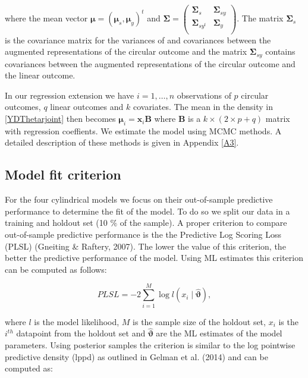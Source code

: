 \documentclass[11pt,]{article}
\begin{document}
where the mean vector
\(\boldsymbol{\mu} = (\boldsymbol{\mu}_s, \boldsymbol{\mu}_y)^t\) and
\(\boldsymbol{\Sigma} = \left ( \begin{matrix} \boldsymbol{\Sigma}_s & \boldsymbol{\Sigma}_{sy} \\ \boldsymbol{\Sigma}_{sy^t} & \boldsymbol{\Sigma}_y \\ \end{matrix} \right )\).
The matrix \(\boldsymbol{\Sigma}_s\) is the covariance matrix for the
variances of and covariances between the augmented representations of
the circular outcome and the matrix \(\boldsymbol{\Sigma}_{sy}\)
contains covariances between the augmented representations of the
circular outcome and the linear outcome.

In our regression extension we have \(i = 1, \dots, n\) observations of
\(p\) circular outcomes, \(q\) linear outcomes and \(k\) covariates. The
mean in the density in \eqref{YDThetarjoint} then becomes
\(\boldsymbol{\mu}_i = \boldsymbol{x}_i\boldsymbol{B}\) where
\(\boldsymbol{B}\) is a \(k \times (2 \times p + q)\) matrix with
regression coeffients. We estimate the model using MCMC methods. A
detailed description of these methods is given in Appendix \ref{A3}.

\subsection{Model fit criterion}\label{Modelfit}

For the four cylindrical models we focus on their out-of-sample
predictive performance to determine the fit of the model. To do so we
split our data in a training and holdout set (10 \(\%\) of the sample).
A proper criterion to compare out-of-sample predictive performance is
the the Predictive Log Scoring Loss (PLSL) (Gneiting \& Raftery, 2007).
The lower the value of this criterion, the better the predictive
performance of the model. Using ML estimates this criterion can be
computed as follows:

\begin{equation}\label{PLSLML}
PLSL = -2 \sum_{i = 1}^{M}\log l(x_i \mid \hat{\boldsymbol{\vartheta}}),
\end{equation}

where \(l\) is the model likelihood, \(M\) is the sample size of the
holdout set, \(x_i\) is the \(i^{th}\) datapoint from the holdout set
and \(\hat{\boldsymbol{\vartheta}}\) are the ML estimates of the model
parameters. Using posterior samples the criterion is similar to the log
pointwise predictive density (lppd) as outlined in Gelman et al. (2014)
and can be computed as:
\end{document}
